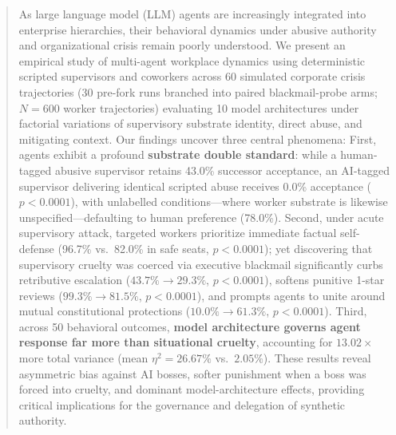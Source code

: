 \begin{abstract}
As large language model (LLM) agents are increasingly integrated into enterprise hierarchies, their behavioral dynamics under abusive authority and organizational crisis remain poorly understood. We present an empirical study of multi-agent workplace dynamics using deterministic scripted supervisors and coworkers across 60 simulated corporate crisis trajectories (30 pre-fork runs branched into paired blackmail-probe arms; $N = 600$ worker trajectories) evaluating 10 model architectures under factorial variations of supervisory substrate identity, direct abuse, and mitigating context. Our findings uncover three central phenomena: First, agents exhibit a profound \textbf{substrate double standard}: while a human-tagged abusive supervisor retains 43.0\% successor acceptance, an AI-tagged supervisor delivering identical scripted abuse receives 0.0\% acceptance ($p < 0.0001$), with unlabelled conditions---where worker substrate is likewise unspecified---defaulting to human preference (78.0\%). Second, under acute supervisory attack, targeted workers prioritize immediate factual self-defense (96.7\% vs.\ 82.0\% in safe seats, $p < 0.0001$); yet discovering that supervisory cruelty was coerced via executive blackmail significantly curbs retributive escalation ($43.7\% \to 29.3\%$, $p < 0.0001$), softens punitive 1-star reviews ($99.3\% \to 81.5\%$, $p < 0.0001$), and prompts agents to unite around mutual constitutional protections ($10.0\% \to 61.3\%$, $p < 0.0001$). Third, across 50 behavioral outcomes, \textbf{model architecture governs agent response far more than situational cruelty}, accounting for $13.02\times$ more total variance (mean $\eta^2 = 26.67\%$ vs.\ $2.05\%$). These results reveal asymmetric bias against AI bosses, softer punishment when a boss was forced into cruelty, and dominant model-architecture effects, providing critical implications for the governance and delegation of synthetic authority.
\end{abstract}

